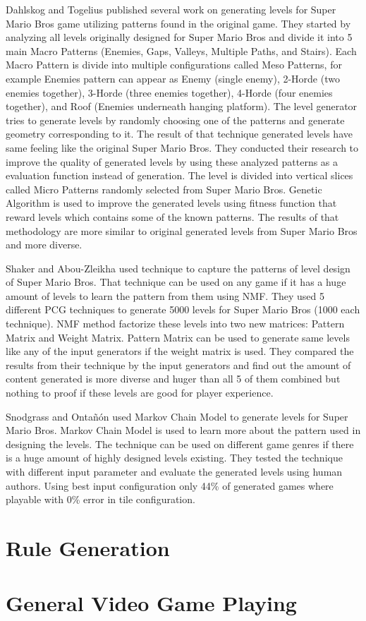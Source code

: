 Dahlskog and Togelius\cite{superMarioPattern1, superMarioPattern2, superMarioPattern3, superMarioPattern4} published several work on generating levels for Super Mario Bros game utilizing patterns found in the original game. They started\cite{superMarioPattern1} by analyzing all levels originally designed for Super Mario Bros and divide it into 5 main Macro Patterns (Enemies, Gaps, Valleys, Multiple Paths, and Stairs). Each Macro Pattern is divide into multiple configurations called Meso Patterns, for example Enemies pattern can appear as Enemy (single enemy), 2-Horde (two enemies together), 3-Horde (three enemies together), 4-Horde (four enemies together), and Roof (Enemies underneath hanging platform). The level generator tries to generate levels by randomly choosing one of the patterns and generate geometry corresponding to it. The result of that technique generated levels have same feeling like the original Super Mario Bros. They conducted their research\cite{superMarioPattern2, superMarioPattern3} to improve the quality of generated levels by using these analyzed patterns as a evaluation function instead of generation. The level is divided into vertical slices called Micro Patterns randomly selected from Super Mario Bros. Genetic Algorithm is used to improve the generated levels using fitness function that reward levels which contains some of the known patterns. The results of that methodology are more similar to original generated levels from Super Mario Bros and more diverse. 

Shaker and Abou-Zleikha\cite{nmfSuperMarioBros} used  technique to capture the patterns of level design of Super Mario Bros. That technique can be used on any game if it has a huge amount of levels to learn the pattern from them using NMF. They used 5 different PCG techniques to generate 5000 levels for Super Mario Bros (1000 each technique). NMF method factorize these levels into two new matrices: Pattern Matrix and Weight Matrix. Pattern Matrix can be used to generate same levels like any of the input generators if the weight matrix is used. They compared the results from their technique by the input generators and find out the amount of content generated is more diverse and huger than all 5 of them combined but nothing to proof if these levels are good for player experience.\\\par

Snodgrass and Ontañón\cite{markovSuperMarioBros} used Markov Chain Model to generate levels for Super Mario Bros. Markov Chain Model is used to learn more about the pattern used in designing the levels. The technique can be used on different game genres if there is a huge amount of highly designed levels existing. They tested the technique with different input parameter and evaluate the generated levels using human authors. Using best input configuration only 44\% of generated games where playable with 0\% error in tile configuration.\\\par

\section{Rule Generation}

\section{General Video Game Playing}